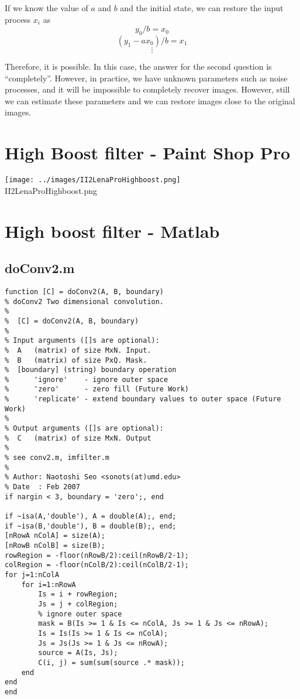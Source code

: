 \documentclass[article,oneside]{memoir}
\begin{document}
If we know the value of $ a $ and $ b $ and the initial state, we can restore the input process $ x_{i} $ as
$$ y_0 / b = x_0 $$
$$ (y_1 - a x_0) / b = x_1 $$
$$ \vdots $$

Therefore, it is possible. In this case, the answer for the second question is "`completely"'. 
However, in practice, we have unknown parameters such as noise processes, and it will be impossible to completely recover images. However, still we can estimate these parameters and we can restore images close to the original images. 

\section{High Boost filter - Paint Shop Pro}

\begin{center}
\texttt{[image: ../images/II2LenaProHighboost.png]}\\
II2LenaProHighboost.png
\end{center}

\section {High boost filter - Matlab}

\subsection{doConv2.m}

\begin{verbatim}
function [C] = doConv2(A, B, boundary)
% doConv2 Two dimensional convolution.
%
%  [C] = doConv2(A, B, boundary)
%
% Input arguments ([]s are optional):
%  A   (matrix) of size MxN. Input.
%  B   (matrix) of size PxQ. Mask.
%  [boundary] (string) boundary operation
%      'ignore'    - ignore outer space
%      'zero'      - zero fill (Future Work)
%      'replicate' - extend boundary values to outer space (Future Work)
%
% Output arguments ([]s are optional):
%  C   (matrix) of size MxN. Output
%
% see conv2.m, imfilter.m
%
% Author: Naotoshi Seo <sonots(at)umd.edu>
% Date  : Feb 2007
if nargin < 3, boundary = 'zero';, end

if ~isa(A,'double'), A = double(A);, end;
if ~isa(B,'double'), B = double(B);, end;
[nRowA nColA] = size(A);
[nRowB nColB] = size(B);
rowRegion = -floor(nRowB/2):ceil(nRowB/2-1);
colRegion = -floor(nColB/2):ceil(nColB/2-1);
for j=1:nColA
    for i=1:nRowA
        Is = i + rowRegion;
        Js = j + colRegion;
        % ignore outer space
        mask = B(Is >= 1 & Is <= nColA, Js >= 1 & Js <= nRowA);
        Is = Is(Is >= 1 & Is <= nColA);
        Js = Js(Js >= 1 & Js <= nRowA);
        source = A(Is, Js);
        C(i, j) = sum(sum(source .* mask));
    end
end
end
\end{verbatim}
\end{document}
